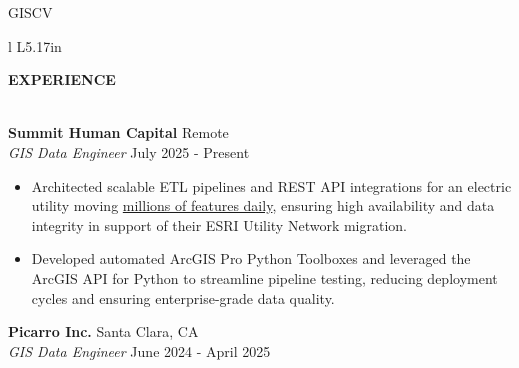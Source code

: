 \documentclass[letterpaper]{article}
\newcommand{\lineunder} {
        \vspace*{-8pt} \\
        \hspace*{-18pt} \hrulefill \\
    }
\newcommand{\header} [1] {
        \vspace{9pt}
        {\hspace*{-18pt}\vspace*{6pt} \large \textbf {#1}}
        \vspace*{-6pt} \lineunder
        \vspace{2pt}
    }
\newcommand{\employer}[4]{
        \vspace{3pt}
        \textbf{#1}  %
        \hfill #2\\  %
        \textit{#3}  %
        \hfill #4\\  %
        \vspace{3mm}
    }
\newenvironment{jobtasklist}
        {
            \vspace{-12pt}
            \begin{itemize} \itemsep 0pt
        }{
            \end{itemize}
            \vspace{-3pt}
        }
\newenvironment{skillslist}
        {
            \hspace*{-0.07in}\begin{tabular}[t]{ l L{5.17in} }
        }{
            \end{tabular}
        }
\newcommand{\impt}[1]{\uline{#1}}
\begin{document}
\begin{taggedblock}{GISCV}
\begin{skillslist}
        \end{skillslist}
    \end{taggedblock}



\header{EXPERIENCE}



\employer
    {Summit Human Capital}
    {Remote}
    {GIS Data Engineer}
    {July 2025 - Present}

\begin{jobtasklist}
    \item Architected scalable ETL pipelines and REST API integrations for an electric utility
            moving \impt{millions of features daily}, ensuring high availability and data integrity
            in support of their ESRI Utility Network migration.
    \item Developed automated ArcGIS Pro Python Toolboxes and leveraged the ArcGIS API for Python
            to streamline pipeline testing, reducing deployment cycles and ensuring enterprise-grade data quality.
\end{jobtasklist}

\employer
    {Picarro Inc.}
    {Santa Clara, CA}
    {GIS Data Engineer}
    {June 2024 - April 2025}
\end{document}
